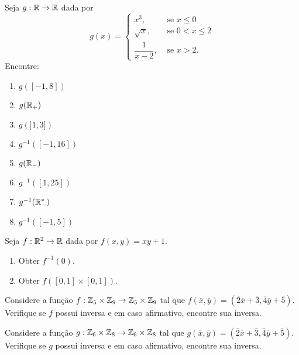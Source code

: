 \documentclass[12pt]{exam}
\begin{document}
\vspace{.3cm}

\questao{} Seja $g : \mathbb{R} \to \mathbb{R}$ dada por
\[
    g(x) = \begin{cases}
        x^3,& \mbox{ se } x \le 0\\
        \sqrt{x}, & \mbox{ se } 0 < x \le 2\\
        \dfrac{1}{x - 2}, & \mbox{ se } x > 2.
    \end{cases}
\]
Encontre:
\begin{multicols}{2}
    \begin{enumerate}[label={\alph*})]
        \item $g([-1,8])$
        \item $g(\mathbb{R}_+)$
        \item $g(]1, 3])$
        \item $g^{-1}([-1,16])$
        \item $g(\mathbb{R}_-)$
        \item $g^{-1}([1,25])$
        \item $g^{-1}(\mathbb{R}^*_-)$
        \item $g^{-1}([-1,5])$
    \end{enumerate} 
\end{multicols}

\vspace{.3cm}

\questao{} Seja $f: \mathbb{R}^2 \to \mathbb{R}$ dada por $f(x,y) = xy + 1$.
\begin{enumerate}[label={\alph*})]
    \item Obter $f^{-1}({0})$.
    \item Obter $f([0,1]\times [0,1])$.
\end{enumerate}

\vspace{.3cm}


\questao{} Considere a fun{\c c}{\~a}o $f : \mathbb{Z}_5 \times \mathbb{Z}_9 \to \mathbb{Z}_5 \times \mathbb{Z}_9$ tal que $f(\overline{x},\overline{y}) = (\overline{2} \overline{x} + \overline{3}, \overline{4}\overline{y} + \overline{5})$. Verifique se $f$ possui inversa e em caso afirmativo, encontre sua inversa.

\vspace{.3cm}

\questao{} Considere a fun{\c c}{\~a}o $g : \mathbb{Z}_6 \times \mathbb{Z}_8 \to \mathbb{Z}_6 \times \mathbb{Z}_8$ tal que $g(\overline{x},\overline{y}) = (\overline{2} \overline{x} + \overline{3}, \overline{4}\overline{y} + \overline{5})$. Verifique se $g$ possui inversa e em caso afirmativo, encontre sua inversa.
\end{document}
